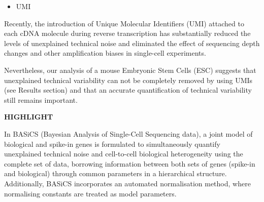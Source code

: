 \documentclass[
]{book}
\providecommand{\tightlist}{%
  \setlength{\itemsep}{0pt}\setlength{\parskip}{0pt}}
\begin{document}
\begin{itemize}
\tightlist
\item
  UMI
\end{itemize}

Recently, the introduction of Unique Molecular Identifiers (UMI) attached to each cDNA molecule during reverse transcription has substantially reduced the levels of unexplained technical noise and eliminated the effect of sequencing depth changes and other amplification biases in single-cell experiments.

Nevertheless, our analysis of a mouse Embryonic Stem Cells (ESC) suggests that unexplained technical variability can not be completely removed by using UMIs (see Results section) and that an accurate quantification of technical variability still remains important.

\textbf{HIGHLIGHT}

In BASiCS (Bayesian Analysis of Single-Cell Sequencing data), a joint model of biological and spike-in genes is formulated to simultaneously quantify unexplained technical noise and cell-to-cell biological heterogeneity using the complete set of data, borrowing information between both sets of genes (spike-in and biological) through common parameters in a hierarchical structure. Additionally, BASiCS incorporates an automated normalisation method, where normalising constants are treated as model parameters.
\end{document}
